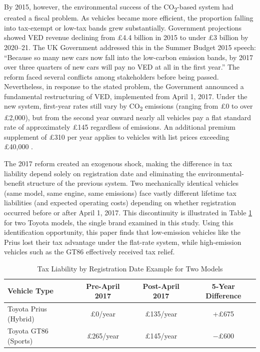 \documentclass[12pt, a4paper]{article}
\begin{document}
By 2015, however, the environmental success of the CO\textsubscript{2}-based system had created a fiscal problem. As vehicles became more efficient, the proportion falling into tax-exempt or low-tax bands grew substantially. Government projections showed VED revenue declining from \pounds 4.4 billion in 2015 to under \pounds 3 billion by 2020--21. The UK Government addressed this in the Summer Budget 2015 speech: “Because so many new cars now fall into the low-carbon emission bands, by 2017 over three quarters of new cars will pay no VED at all in the first year.” The reform faced several conflicts among stakeholders before being passed. Nevertheless, in response to the stated problem, the Government announced a fundamental restructuring of VED, implemented from April 1, 2017. Under the new system, first-year rates still vary by CO\textsubscript{2} emissions (ranging from \pounds 0 to over \pounds 2,000), but from the second year onward nearly all vehicles pay a flat standard rate of approximately \pounds 145 regardless of emissions. An additional premium supplement of \pounds 310 per year applies to vehicles with list prices exceeding \pounds 40,000 \citep{hmt2015, dvla2015, dvla2017}.

The 2017 reform created an exogenous shock, making the difference in tax liability depend solely on registration date and eliminating the environmental-benefit structure of the previous system. Two mechanically identical vehicles (same model, same engine, same emissions) face vastly different lifetime tax liabilities (and expected operating costs) depending on whether registration occurred before or after April 1, 2017. This discontinuity is illustrated in Table \ref{tab:tax_discontinuity} for two Toyota models, the single brand examined in this study. Using this identification opportunity, this paper finds that low-emission vehicles like the Prius lost their tax advantage under the flat-rate system, while high-emission vehicles such as the GT86 effectively received tax relief.


\begin{table}[H]
\centering
\caption{Tax Liability by Registration Date Example for Two Models}
\label{tab:tax_discontinuity}
\begin{tabular}{lccc}
\toprule
Vehicle Type & Pre-April 2017 & Post-April 2017 & 5-Year Difference \\
\midrule
Toyota Prius (Hybrid) & \pounds 0/year & \pounds 135/year & +\pounds 675 \\
Toyota GT86 (Sports) & \pounds 265/year & \pounds 145/year & $-$\pounds 600 \\
\bottomrule
\end{tabular}
\end{table}
\end{document}
